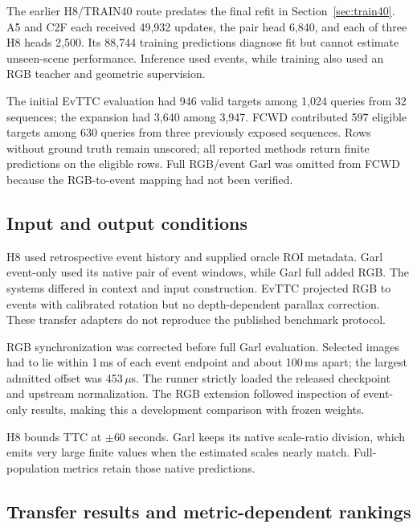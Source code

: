 The earlier H8/TRAIN40 route predates the final refit in Section~\ref{sec:train40}. A5 and C2F each received 49,932 updates, the pair head 6,840, and each of three H8 heads 2,500. Its 88,744 training predictions diagnose fit but cannot estimate unseen-scene performance. Inference used events, while training also used an RGB teacher and geometric supervision.

The initial EvTTC evaluation had 946 valid targets among 1,024 queries from 32 sequences; the expansion had 3,640 among 3,947. FCWD contributed 597 eligible targets among 630 queries from three previously exposed sequences. Rows without ground truth remain unscored; all reported methods return finite predictions on the eligible rows. Full RGB/event Garl was omitted from FCWD because the RGB-to-event mapping had not been verified. 

\subsection{Input and output conditions}

H8 used retrospective event history and supplied oracle ROI metadata. Garl event-only used its native pair of event windows, while Garl full added RGB. The systems differed in context and input construction. EvTTC projected RGB to events with calibrated rotation but no depth-dependent parallax correction. These transfer adapters do not reproduce the published benchmark protocol.

RGB synchronization was corrected before full Garl evaluation. Selected images had to lie within 1\,ms of each event endpoint and about 100\,ms apart; the largest admitted offset was 453\,$\mu$s. The runner strictly loaded the released checkpoint and upstream normalization. The RGB extension followed inspection of event-only results, making this a development comparison with frozen weights.

H8 bounds TTC at $\pm60$ seconds. Garl keeps its native scale-ratio division, which emits very large finite values when the estimated scales nearly match. Full-population metrics retain those native predictions. 

\subsection{Transfer results and metric-dependent rankings}



